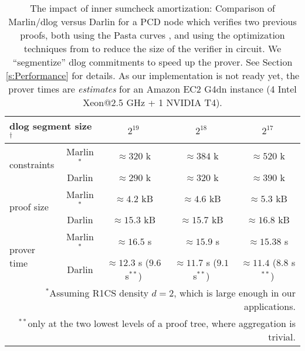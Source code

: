 \documentclass[10pt,article,oneside]{memoir}
\theoremstyle{definition}
\theoremstyle{remark}
\begin{document}

\begin{table}
\caption{
The impact of inner sumcheck amortization: 
Comparison of Marlin/dlog \cite{Marlin} versus Darlin for a PCD node which verifies two previous proofs, both using the Pasta curves \cite{PastaCurves}, and using the optimization techniques from \cite{Halo} to  reduce the size of the verifier in circuit. 
We ``segmentize'' dlog commitments to speed up the prover.
See Section \ref{s:Performance} for details.
As our implementation is not ready yet, the prover times are \textit{estimates} for an Amazon EC2 G4dn instance (4 Intel Xeon@2.5 GHz + 1 NVIDIA T4). 
}
\label{t:DarlinVsMarlin}
\begin{center}
\hspace*{-0.3cm}
\begin{tabular}{|l|c|c|c|c|}
\hline
\multicolumn{2}{|l|}{dlog segment size$^\dag$} &  $2^{19}$ & $2^{18}$ &$2^{17}$
\\\hline
\multirow{2}{*}{constraints}  & Marlin$^{*}$ &  $\approx 320$ k & $\approx  384$ k & $\approx 520$ k
\\
& Darlin &   $\approx 290$ k & $\approx 320$ k & $\approx 390$ k
\\\hline
\multirow{2}{*}{proof size}  &  Marlin$^{*}$ & $\approx 4.2$ kB & $\approx 4.6$ kB & $\approx 5.3$ kB
\\
 & Darlin &  $\approx 15.3$ kB & $\approx 15.7$ kB &  $\approx 16.8$ kB
\\\hline
\multirow{2}{*}{prover time}  &  Marlin$^{*}$ &  $\approx 16.5$ s & $\approx 15.9$ s & $\approx 15.38$ s
\\
 & Darlin &   $\approx 12.3$ s ($9.6$ s$^{**}$) & $\approx 11.7$ s ($9.1$ s$^{**}$) & $\approx 11.4 $  ($8.8$ s$^{**}$)
\\\hline
\multicolumn{5}{r}{$^{*}${\small Assuming R1CS density $d=2$, which is large enough in our applications.
}}
\\
\multicolumn{5}{r}{$^{**}${\small only at the two lowest levels of a proof tree, where aggregation is trivial.}}
\end{tabular}
\end{center}
\end{table}
\end{document}
